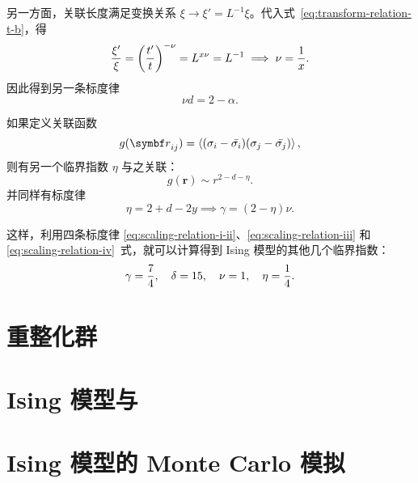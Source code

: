 另一方面，关联长度满足变换关系 $\xi\to\xi'=L^{-1}\xi$。代入式~\eqref{eq:transform-relation-t-b}，得
\begin{equation}
  \frac{\xi'}{\xi} = \qty(\frac{t'}{t})^{-\nu} = L^{x\nu} = L^{-1}
  \implies \nu = \frac{1}{x}.
\end{equation}
因此得到另一条标度律
\begin{equation}
  \label{eq:scaling-relation-iii}
  \nu d = 2 - \alpha.
\end{equation}

如果定义关联函数
\begin{equation}
  g(\bm{r}_{ij}) = \ev{(\sigma_i-\bar{\sigma_i})(\sigma_j-\bar{\sigma_j})},
\end{equation}
则有另一个临界指数 $\eta$ 与之关联：
\begin{equation}
  g(\bm{r}) \sim r^{2-d-\eta}.
\end{equation}
并同样有标度律
\begin{equation}
  \label{eq:scaling-relation-iv}
  \eta = 2 + d - 2y \implies \gamma = (2-\eta) \nu.
\end{equation}

这样，利用四条标度律 \eqref{eq:scaling-relation-i-ii}、\eqref{eq:scaling-relation-iii} 和
\eqref{eq:scaling-relation-iv}~式，就可以计算得到 Ising 模型的其他几个临界指数：
\begin{equation}
  \gamma = \frac{7}{4} \qc
  \delta = 15          \qc
  \nu    = 1           \qc
  \eta   = \frac{1}{4}.
\end{equation}

\section{重整化群}
\section{Ising 模型与 \AdSCFT{}}
\section{Ising 模型的 Monte Carlo 模拟}
